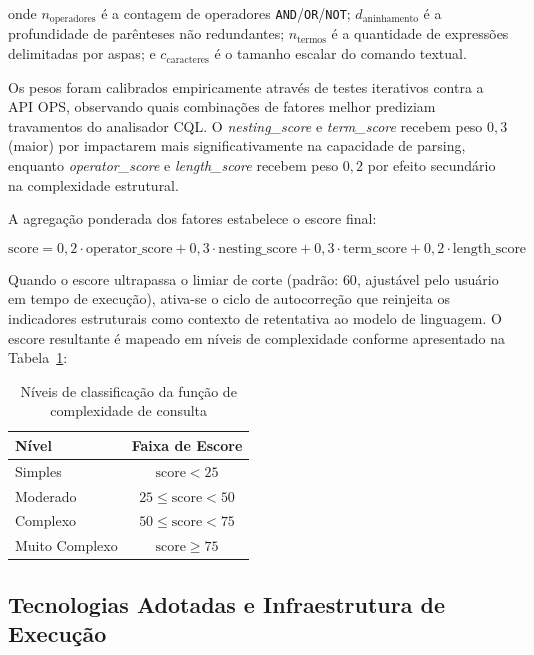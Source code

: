 \documentclass[12pt, a4paper]{article}
\begin{document}
  onde $n_{\text{operadores}}$ é a contagem de operadores \texttt{AND}/\texttt{OR}/\texttt{NOT}; $d_{\text{aninhamento}}$ é a profundidade de parênteses não redundantes; $n_{\text{termos}}$ é a quantidade de expressões delimitadas por aspas; e $c_{\text{caracteres}}$ é o tamanho escalar do comando textual.

  Os pesos foram calibrados empiricamente através de testes iterativos contra a API OPS, observando quais combinações de fatores melhor prediziam travamentos do analisador CQL. O \textit{nesting\_score} e \textit{term\_score} recebem peso $0{,}3$ (maior) por impactarem mais significativamente na capacidade de parsing, enquanto \textit{operator\_score} e \textit{length\_score} recebem peso $0{,}2$ por efeito secundário na complexidade estrutural.

  A agregação ponderada dos fatores estabelece o escore final:

$$
\text{score} = 0{,}2 \cdot \text{operator\_score} + 0{,}3 \cdot \text{nesting\_score} + 0{,}3 \cdot \text{term\_score} + 0{,}2 \cdot \text{length\_score}
$$

  Quando o escore ultrapassa o limiar de corte (padrão: $60$, ajustável pelo usuário em tempo de execução), ativa-se o ciclo de autocorreção que reinjeita os indicadores estruturais como contexto de retentativa ao modelo de linguagem. O escore resultante é mapeado em níveis de complexidade conforme apresentado na Tabela~\ref{tab:complexidade}:

\begin{table}[H]
\centering
\caption{Níveis de classificação da função de complexidade de consulta}
\label{tab:complexidade}
\begin{tabular}{lc}
\toprule
\textbf{Nível} & \textbf{Faixa de Escore} \\
\midrule
Simples & $\text{score} < 25$ \\
Moderado & $25 \le \text{score} < 50$ \\
Complexo & $50 \le \text{score} < 75$ \\
Muito Complexo & $\text{score} \ge 75$ \\
\bottomrule
\end{tabular}
\end{table}

  \subsection{Tecnologias Adotadas e Infraestrutura de Execução}
  \label{sec:tecnologias}
\end{document}
